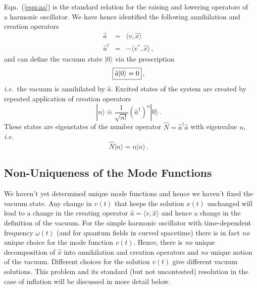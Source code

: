 \documentclass[12pt,letterpaper,rotate]{article}
\def\beq{\begin{equation}}
\def\eeq{\end{equation}}
\begin{document}
{\begin{equation}
\end{equation}
Eqn.~(\ref{equ:aa}) is
the standard relation for the raising and lowering operators of a harmonic oscillator.
We have hence identified the following annihilation and creation operators
\begin{eqnarray}
\hat{a} &=& \langle v, \hat{x} \rangle\\
\hat{a}^\dagger &=& -\langle v^*, \hat{x} \rangle\, ,
\end{eqnarray} 
and can define the vacuum state $| 0 \rangle$ via the prescription
\begin{equation}
\fbox{$\displaystyle \hat{a} | 0 \rangle = 0$}\, ,
\end{equation}
{\it i.e.}~the vacuum is annihilated by $\hat a$.
Excited states of the system are created by repeated application of creation operators
\begin{equation}
| n \rangle \equiv \frac{1}{\sqrt{n!}} (\hat{a}^\dagger)^n | 0 \rangle\, .
\end{equation}
These states are eigenstates of the number operator $\hat{N} = \hat{a}^\dagger \hat{a}$ with eigenvalue $n$, {\it i.e.}
\beq
\hat N | n \rangle = n | n \rangle\, .
\eeq


\subsection{Non-Uniqueness of the Mode Functions}

We haven't yet determined unique mode functions and hence we haven't fixed the vacuum state.
Any change in $v(t)$ that keeps the solution $x(t)$ unchanged will lead to a change in the creating operator $\hat{a} = \langle v, \hat{x}\rangle$ and hence a change in the definition of the vacuum.
 For the simple harmonic oscillator with time-dependent frequency $\omega(t)$ (and for quantum fields in curved spacetime) there is in fact {\it no} unique choice for the mode function $v(t)$. Hence, there is {\it no} unique decomposition of $\hat{x}$ into annihilation and creation operators and {\it no} unique notion of the vacuum. Different choices for the solution $v(t)$ give different vacuum solutions. This problem and its standard (but not uncontested) resolution in the case of inflation will be discussed in more detail below.


}
\end{document}
